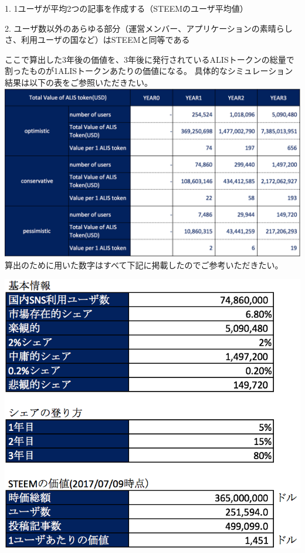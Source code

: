 \documentclass{jsarticle}
\begin{document}
1. 1ユーザが平均2つの記事を作成する（STEEMのユーザ平均値）

2. ユーザ数以外のあらゆる部分（運営メンバー、アプリケーションの素晴らしさ、利用ユーザの国など）はSTEEMと同等である

ここで算出した3年後の価値を、3年後に発行されているALISトークンの総量で割ったものが1ALISトークンあたりの価値になる。
具体的なシミュレーション結果は以下の表をご参照いただきたい。
	\includegraphics[scale=0.6]{img/financialtable.png}
算出のために用いた数字はすべて下記に掲載したのでご参考いただきたい。

\begin{center}
	\includegraphics[scale=0.6]{img/base-info-of-finace.png}
\end{center}
\end{document}
